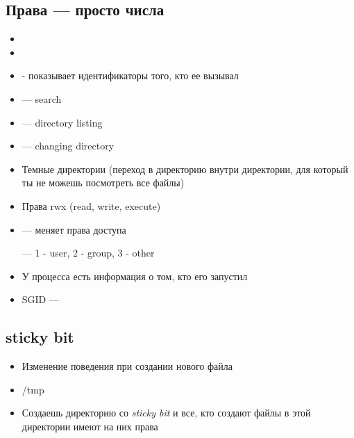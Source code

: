 \documentclass[../../lectures.tex]{subfiles}
\begin{document}
\subsection{Права --- просто числа}
\begin{itemize}
    \item {}
    \item {}
    \item {} - показывает идентификаторы того, кто ее вызывал
    \item {} --- search
    \item {} --- directory listing
    \item {} --- changing directory
    \item Темные директории (переход в директорию внутри директории, для который ты не можешь посмотреть все файлы)
    \item Права rwx (read, write, execute)
    \item {} --- меняет права доступа
          
           --- 1 - user, 2 - group, 3 - other
    \item У процесса есть информация о том, кто его запустил
    \item SGID --- \todo{}
\end{itemize}
\subsection{sticky bit}
\begin{itemize}
    \item Изменение поведения при создании нового файла
    \item /tmp
    \item Создаешь директорию со \emph{sticky bit} и все, кто создают файлы в этой директории имеют на них права
\end{itemize}
\end{document}

